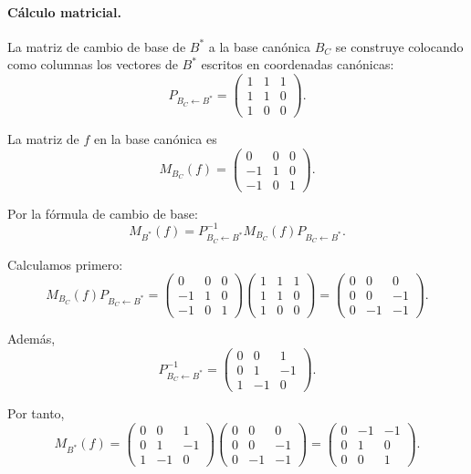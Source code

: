 \documentclass[12pt]{article}
\begin{document}
\paragraph{Cálculo matricial.}

La matriz de cambio de base de \(B^*\) a la base canónica \(B_C\) se construye colocando como columnas los vectores de \(B^*\) escritos en coordenadas canónicas:
\[
P_{B_C\leftarrow B^*}
=
\begin{pmatrix}
1&1&1\\
1&1&0\\
1&0&0
\end{pmatrix}.
\]

La matriz de \(f\) en la base canónica es
\[
M_{B_C}(f)=
\begin{pmatrix}
0&0&0\\
-1&1&0\\
-1&0&1
\end{pmatrix}.
\]

Por la fórmula de cambio de base:
\[
M_{B^*}(f)
=
P_{B_C\leftarrow B^*}^{-1}
M_{B_C}(f)
P_{B_C\leftarrow B^*}.
\]

Calculamos primero:
\[
M_{B_C}(f)P_{B_C\leftarrow B^*}
=
\begin{pmatrix}
0&0&0\\
-1&1&0\\
-1&0&1
\end{pmatrix}
\begin{pmatrix}
1&1&1\\
1&1&0\\
1&0&0
\end{pmatrix}
=
\begin{pmatrix}
0&0&0\\
0&0&-1\\
0&-1&-1
\end{pmatrix}.
\]

Además,
\[
P_{B_C\leftarrow B^*}^{-1}
=
\begin{pmatrix}
0&0&1\\
0&1&-1\\
1&-1&0
\end{pmatrix}.
\]

Por tanto,
\[
M_{B^*}(f)
=
\begin{pmatrix}
0&0&1\\
0&1&-1\\
1&-1&0
\end{pmatrix}
\begin{pmatrix}
0&0&0\\
0&0&-1\\
0&-1&-1
\end{pmatrix}
=
\begin{pmatrix}
0&-1&-1\\
0&1&0\\
0&0&1
\end{pmatrix}.
\]
\end{document}
